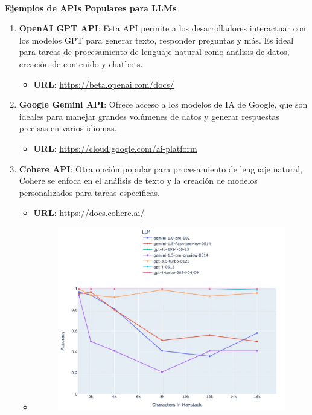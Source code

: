 \documentclass[
  10pt,
  letterpaper,
]{book}
\makeatletter
\let\oldparagraph\paragraph
\renewcommand{\paragraph}{
    \@ifstar
      \xxxParagraphStar
      \xxxParagraphNoStar
  }
\newcommand{\xxxParagraphStar}[1]{\oldparagraph*{#1}\mbox{}}
\newcommand{\xxxParagraphNoStar}[1]{\oldparagraph{#1}\mbox{}}
\providecommand{\tightlist}{%
  \setlength{\itemsep}{0pt}\setlength{\parskip}{0pt}}\usepackage{longtable,booktabs,array}
\makeatother
\begin{document}
\paragraph{\texorpdfstring{\textbf{Ejemplos de APIs Populares para
LLMs}}{Ejemplos de APIs Populares para LLMs}}\label{ejemplos-de-apis-populares-para-llms}

\begin{enumerate}
\def\labelenumi{\arabic{enumi}.}
\tightlist
\item
  \textbf{OpenAI GPT API}: Esta API permite a los desarrolladores
  interactuar con los modelos GPT para generar texto, responder
  preguntas y más. Es ideal para tareas de procesamiento de lenguaje
  natural como análisis de datos, creación de contenido y chatbots.

  \begin{itemize}
  \tightlist
  \item
    \textbf{URL}: \url{https://beta.openai.com/docs/}
  \end{itemize}
\item
  \textbf{Google Gemini API}: Ofrece acceso a los modelos de IA de
  Google, que son ideales para manejar grandes volúmenes de datos y
  generar respuestas precisas en varios idiomas.

  \begin{itemize}
  \tightlist
  \item
    \textbf{URL}: \url{https://cloud.google.com/ai-platform}
  \end{itemize}
\item
  \textbf{Cohere API}: Otra opción popular para procesamiento de
  lenguaje natural, Cohere se enfoca en el análisis de texto y la
  creación de modelos personalizados para tareas específicas.

  \begin{itemize}
  \item
    \textbf{URL}: \url{https://docs.cohere.ai/}
  \item
    \begin{figure}[H]

    {\centering \includegraphics{Img/models.png}

}
\end{figure}
\end{itemize}
\end{enumerate}
\end{document}
